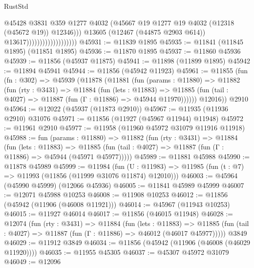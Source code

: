 \begin{lexlean}{RustStd}
\begin{coremodule}
                                              @45428
                                              @3831
                                              @359
                                              @1277
                                              @4032
                                              (@45667
                                                @19
                                                @1277
                                                @19
                                                @4032
                                                (@12318 (@45672 @19))
                                                @12346)))
                                          @13605
                                          (@12467 (@44875 @2903 @614))
                                          @13617)))))))))))))))))))
@45931 := @11839 @1895
@45935 := @11841 (@11845 @1895) (@11851 @1895)
@45936 := @11870 @1895
@45937 := @11860 @45936
@45939 := @11856 (@45937 @11875)
@45941 := @11898 (@11899 @1895)
@45942 := @11894 @45941
@45944 := @11856 (@45942 @11923)
@45961 := @11855
    (fun (fn : @302) =>
    @45939
      (@11878
        (@11881
          (fun (params : @11880) =>
          @11882
            (fun (rty : @3431) =>
            @11884
              (fun (lets : @11883) =>
              @11885 (fun (tail : @4027) => @11887 (fun (Γ : @11886) => @45944 @11970))))))
        @12016))
    @2910
@45964 := @12022 (@45937 (@11873 @2910))
@45967 := @11935 (@11936 @2910) @31076
@45971 := @11856 (@11927 (@45967 @11944) @11948)
@45972 := @11961 @2910
@45977 := @11958 (@11960 @45972 @31079 @11916 @11918)
@45988 := fun (params : @11880) =>
  @11882
    (fun (rty : @3431) =>
    @11884
      (fun (lets : @11883) =>
      @11885 (fun (tail : @4027) => @11887 (fun (Γ : @11886) => @45944 (@45971 @45977)))))
@45989 := @11881 @45988
@45990 := @11878 @45989
@45999 := @11984
    (fun (U : @11983) => @11985 (fun (t : @7) => @11993 (@11856 (@11999 @31076 @11874) @12010)))
@46003 := @45964 (@45990 @45999) (@12066 @45936)
@46005 := @11841 @45989 @45999
@46007 := @12071 @45988 @10253
@46008 := @11908 @10253
@46012 := @11856 (@45942 (@11906 (@46008 @11921)))
@46014 := @45967 (@11943 @10253)
@46015 := @11927 @46014
@46017 := @11856 (@46015 @11948)
@46028 := @12074
    (fun (rty : @3431) =>
    @11884
      (fun (lets : @11883) =>
      @11885 (fun (tail : @4027) => @11887 (fun (Γ : @11886) => @46012 (@46017 @45977)))))
    @3849
@46029 := @11912 @3849
@46034 := @11856 (@45942 (@11906 (@46008 (@46029 @11920))))
@46035 := @11955 @45305
@46037 := @45307 @45972 @31079
@46049 := @12096

\end{coremodule}
\end{lexlean}
